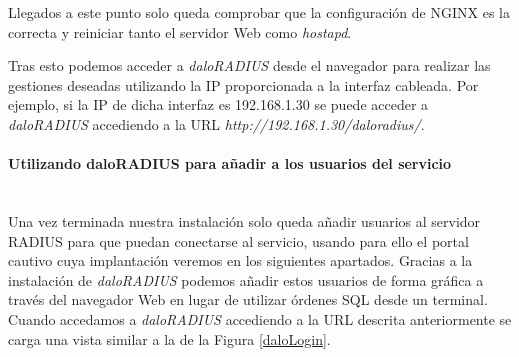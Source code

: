 
Llegados a este punto solo queda comprobar que la configuración de NGINX es la correcta y reiniciar tanto el servidor Web como \emph{hostapd}.


Tras esto podemos acceder a \emph{daloRADIUS} desde el navegador para realizar las gestiones deseadas utilizando la IP proporcionada a la interfaz cableada. Por ejemplo, si la IP de dicha interfaz es 192.168.1.30 se puede acceder a \emph{daloRADIUS} accediendo a la URL \emph{http://192.168.1.30/daloradius/}.

\paragraph{Utilizando daloRADIUS para añadir a los usuarios del servicio} \label{daloRADIUSusers} ~\\

Una vez terminada nuestra instalación solo queda añadir usuarios al servidor RADIUS para que puedan conectarse al servicio, usando para ello el portal cautivo cuya implantación veremos en los siguientes apartados. Gracias a la instalación de \emph{daloRADIUS} podemos añadir estos usuarios de forma gráfica a través del navegador Web en lugar de utilizar órdenes SQL desde un terminal. Cuando accedamos a \emph{daloRADIUS} accediendo a la URL descrita anteriormente se carga una vista similar a la de la Figura \ref{daloLogin}.

